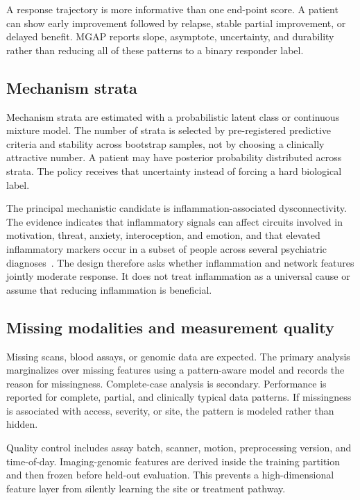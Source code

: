\documentclass[conference]{IEEEtran}
\begin{document}
A response trajectory is more informative than one end-point score. A patient can show early improvement followed by relapse, stable partial improvement, or delayed benefit. MGAP reports slope, asymptote, uncertainty, and durability rather than reducing all of these patterns to a binary responder label.

\subsection{Mechanism strata}
Mechanism strata are estimated with a probabilistic latent class or continuous mixture model. The number of strata is selected by pre-registered predictive criteria and stability across bootstrap samples, not by choosing a clinically attractive number. A patient may have posterior probability distributed across strata. The policy receives that uncertainty instead of forcing a hard biological label.

The principal mechanistic candidate is inflammation-associated dysconnectivity. The evidence indicates that inflammatory signals can affect circuits involved in motivation, threat, anxiety, interoception, and emotion, and that elevated inflammatory markers occur in a subset of people across several psychiatric diagnoses~\cite{goldsmith2023}. The design therefore asks whether inflammation and network features jointly moderate response. It does not treat inflammation as a universal cause or assume that reducing inflammation is beneficial.

\subsection{Missing modalities and measurement quality}
Missing scans, blood assays, or genomic data are expected. The primary analysis marginalizes over missing features using a pattern-aware model and records the reason for missingness. Complete-case analysis is secondary. Performance is reported for complete, partial, and clinically typical data patterns. If missingness is associated with access, severity, or site, the pattern is modeled rather than hidden.

Quality control includes assay batch, scanner, motion, preprocessing version, and time-of-day. Imaging-genomic features are derived inside the training partition and then frozen before held-out evaluation. This prevents a high-dimensional feature layer from silently learning the site or treatment pathway.
\end{document}
